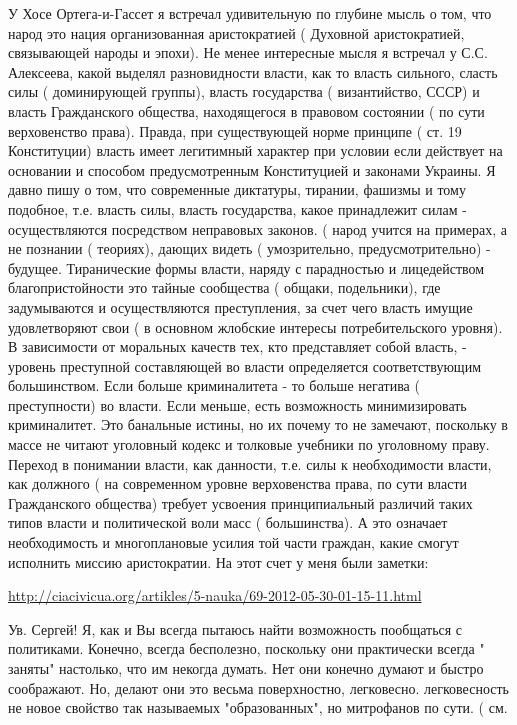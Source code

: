 \begin{itemize} %

У Хосе Ортега-и-Гассет я встречал удивительную по глубине мысль о том, что
народ это нация организованная аристократией ( Духовной аристократией,
связывающей народы и эпохи). Не менее интересные мысля я встречал у С.С.
Алексеева, какой выделял разновидности власти, как то власть сильного, сласть
силы ( доминирующей группы), власть государства ( византийство, СССР) и власть
Гражданского общества, находящегося в правовом состоянии ( по сути верховенство
права). Правда, при существующей норме принципе ( ст. 19 Конституции) власть
имеет легитимный характер при условии если действует на основании и способом
предусмотренным Конституцией и законами Украины. Я давно пишу о том, что
современные диктатуры, тирании, фашизмы и тому подобное, т.е. власть силы,
власть государства, какое принадлежит силам - осуществляются посредством
неправовых законов. ( народ учится на примерах, а не познании ( теориях),
дающих видеть ( умозрительно, предусмотрительно) - будущее. Тиранические формы
власти, наряду с парадностью и лицедейством благопристойности это тайные
сообщества ( общаки, подельники), где задумываются и осуществляются
преступления, за счет чего власть имущие удовлетворяют свои ( в основном
жлобские интересы потребительского уровня). В зависимости от моральных качеств
тех, кто представляет собой власть, - уровень преступной составляющей во власти
определяется соответствующим большинством. Если больше криминалитета - то
больше негатива ( преступности) во власти. Если меньше, есть возможность
минимизировать криминалитет. Это банальные истины, но их почему то не замечают,
поскольку в массе не читают уголовный кодекс и толковые учебники по уголовному
праву. Переход в понимании власти, как данности, т.е. силы к необходимости
власти, как должного ( на современном уровне верховенства права, по сути власти
Гражданского общества) требует усвоения принципиальный различий таких типов
власти и политической воли масс ( большинства). А это означает необходимость и
многоплановые усилия той части граждан, какие смогут исполнить миссию
аристократии. На этот счет у меня были заметки:

\url{http://ciacivicua.org/artikles/5-nauka/69-2012-05-30-01-15-11.html}


Ув. Сергей! Я, как и Вы всегда пытаюсь найти возможность пообщаться с
политиками. Конечно, всегда бесполезно, поскольку они практически всегда "
заняты" настолько, что им некогда думать. Нет они конечно думают и быстро
соображают. Но, делают они это весьма поверхностно, легковесно. легковесность
не новое свойство так называемых "образованных", но митрофанов по сути. ( см. 


\end{itemize}
